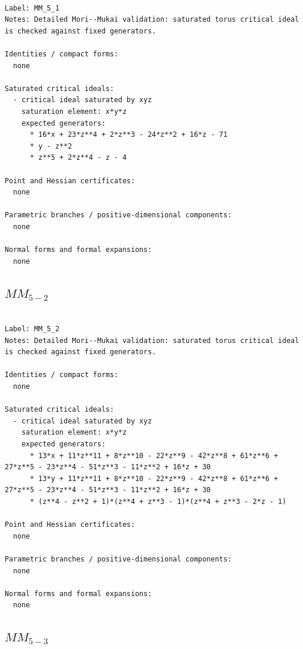 \documentclass[10pt,a4paper]{article}
\begin{document}
\begin{lstlisting}

Label: MM_5_1
Notes: Detailed Mori--Mukai validation: saturated torus critical ideal is checked against fixed generators.

Identities / compact forms:
  none

Saturated critical ideals:
  - critical ideal saturated by xyz
    saturation element: x*y*z
    expected generators:
      * 16*x + 23*z**4 + 2*z**3 - 24*z**2 + 16*z - 71
      * y - z**2
      * z**5 + 2*z**4 - z - 4

Point and Hessian certificates:
  none

Parametric branches / positive-dimensional components:
  none

Normal forms and formal expansions:
  none

\end{lstlisting}

\subsection*{$ MM_{5-2} $}

\begin{lstlisting}

Label: MM_5_2
Notes: Detailed Mori--Mukai validation: saturated torus critical ideal is checked against fixed generators.

Identities / compact forms:
  none

Saturated critical ideals:
  - critical ideal saturated by xyz
    saturation element: x*y*z
    expected generators:
      * 13*x + 11*z**11 + 8*z**10 - 22*z**9 - 42*z**8 + 61*z**6 + 27*z**5 - 23*z**4 - 51*z**3 - 11*z**2 + 16*z + 30
      * 13*y + 11*z**11 + 8*z**10 - 22*z**9 - 42*z**8 + 61*z**6 + 27*z**5 - 23*z**4 - 51*z**3 - 11*z**2 + 16*z + 30
      * (z**4 - z**2 + 1)*(z**4 + z**3 - 1)*(z**4 + z**3 - 2*z - 1)

Point and Hessian certificates:
  none

Parametric branches / positive-dimensional components:
  none

Normal forms and formal expansions:
  none

\end{lstlisting}

\subsection*{$ MM_{5-3} $}
\end{document}
